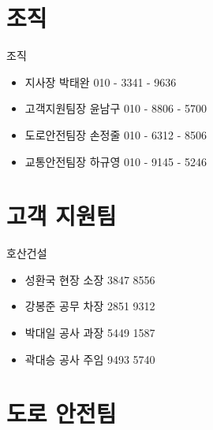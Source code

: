 \documentclass[aspectratio=1610,17pt,xcolor=pdftex,dvipsnames,table,handout]{beamer}
\begin{document}
		\section{ 조직}
		\frame [plain] {\sectionpage}

		\begin{frame} [t,plain]
			\begin{block} {조직}
			\begin{itemize}
				\item 지사장	박태완	010 - 3341 - 9636
				\item 고객지원팀장	윤남구	010 - 8806 - 5700
				\item 도로안전팀장	손정줄	010 - 6312 - 8506
				\item 교통안전팀장	하규영	010 - 9145 - 5246
			\end{itemize}
			\end{block}
		\end{frame}



		\section{ 고객 지원팀 }
		\frame [plain] {\sectionpage}


		\begin{frame} [t,plain]
			\begin{block} {호산건설  }
			\begin{itemize}
				\item 성환국 현장 소장 3847 8556
				\item 강봉준 공무 차장 2851 9312
				\item 박대일 공사 과장 5449 1587
				\item 곽대승 공사 주임 9493 5740
			\end{itemize}
			\end{block}
		\end{frame}


		\section{ 도로 안전팀 }
		\frame [plain] {\sectionpage}
\end{document}
